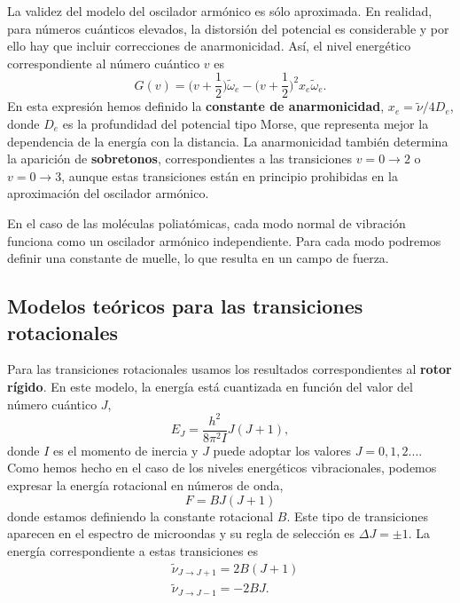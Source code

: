 \documentclass{tufte-book}
\begin{document}
La validez del modelo del oscilador armónico es sólo aproximada.
En realidad, para números cuánticos elevados, la distorsión del
potencial es considerable y por ello hay que incluir correcciones
de anarmonicidad. Así, el nivel energético correspondiente al 
número cuántico $v$ es
\begin{equation}
    G(v) = \bigg(v+\frac{1}{2}\bigg)\tilde{\omega}_e - \bigg(v+\frac{1}{2}\bigg)^2x_e\tilde{\omega}_e.
\end{equation}
En esta expresión hemos definido la \textbf{constante de anarmonicidad}, 
$x_e=\tilde{\nu}/4D_e$, donde $D_e$ es la profundidad del potencial
tipo Morse, que representa mejor la dependencia de la energía con
la distancia. La anarmonicidad también determina la aparición
de \textbf{sobretonos}, correspondientes a las transiciones
$v=0\rightarrow 2$ o $v=0\rightarrow 3$, aunque estas transiciones 
están en principio prohibidas en la aproximación del oscilador armónico.

En el caso de las moléculas poliatómicas, cada modo normal de vibración
funciona como un oscilador armónico independiente. Para cada modo 
podremos definir una constante de muelle, lo que resulta en un
campo de fuerza.

\subsection{Modelos teóricos para las transiciones rotacionales}
Para las transiciones rotacionales usamos los resultados  
correspondientes al \textbf{rotor rígido}. En este modelo, 
la energía está cuantizada en función del valor del número cuántico
$J$,
\begin{equation}
    E_J=\frac{h^2}{8\pi^2I}J(J+1),
\end{equation}
donde $I$ es el momento de inercia y $J$ puede adoptar los valores 
$J=0,1,2...$. Como hemos hecho en el caso de los niveles energéticos
vibracionales, podemos expresar la energía rotacional en números de 
onda,
\begin{equation}
    F=BJ(J+1)
    \label{eq:F}
\end{equation}
donde estamos definiendo la constante rotacional $B$. Este
tipo de transiciones aparecen en el espectro de microondas y su
regla de selección es $\Delta J=\pm 1$. La energía correspondiente 
a estas transiciones es
\begin{align}
    &\tilde{\nu}_{J\rightarrow J+1} = 2B(J+1)\\
    &\tilde{\nu}_{J\rightarrow J-1} = -2BJ.
\end{align}
\end{document}
